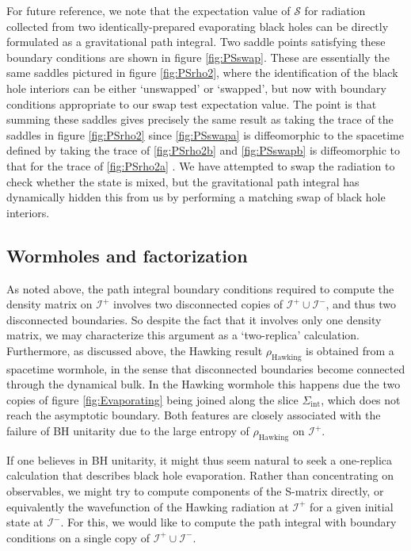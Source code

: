 \documentclass[letterpaper,12pt]{article}
\newcommand*{\scri}{\mathscr{I}} %
\newcommand*{\swap}{\mathcal{S}} %
\begin{document}
For future reference, we note that the expectation value of $\swap$ for radiation collected from two identically-prepared evaporating black holes can be directly formulated as a gravitational path integral. Two saddle points satisfying these boundary conditions are shown in figure \ref{fig:PSswap}.  These are essentially the same saddles pictured in figure \ref{fig:PSrho2}, where the identification of the black hole interiors can be either `unswapped' or `swapped', but now with boundary conditions appropriate to our swap test expectation value. The point is that summing these saddles gives precisely the same result as taking the trace of the saddles in figure \ref{fig:PSrho2} since \ref{fig:PSswapa} is diffeomorphic to the spacetime defined by taking the trace of \ref{fig:PSrho2b} and \ref{fig:PSswapb} is diffeomorphic to that for the trace of \ref{fig:PSrho2a} .
We have attempted to swap the radiation to check whether the state is mixed, but the gravitational path integral has dynamically hidden this from us by performing a matching swap of black hole interiors.

\subsection{Wormholes and factorization}
\label{sec:SW}

As noted above,  the path integral boundary conditions  required to compute the density matrix on $\scri^+$ involves two disconnected copies of $\scri^+ \cup \scri^-$, and thus two disconnected boundaries. So despite the fact that it involves only one density matrix, we may characterize this argument as a `two-replica' calculation.  Furthermore, as discussed above, the Hawking result $\rho_\text{Hawking}$ is obtained from a spacetime wormhole, in the sense that disconnected boundaries become connected through the dynamical bulk.  In the Hawking wormhole this happens due the two copies of figure \ref{fig:Evaporating} being joined along the slice $\Sigma_\mathrm{int}$, which does not reach the asymptotic boundary.  Both features are closely associated with the failure of BH unitarity due to the large entropy of $\rho_{\text{Hawking}}$ on $\scri^+$.


If one believes in BH unitarity, it might thus seem natural to seek a one-replica calculation that describes black hole evaporation.
Rather than concentrating on observables, we might try to compute components of the S-matrix directly, or equivalently the wavefunction of the Hawking radiation at $\scri^+$ for a given initial state at $\scri^-$. For this, we would like to compute the path integral with boundary conditions on a single copy of $\scri^+ \cup \scri^-$.
\end{document}
